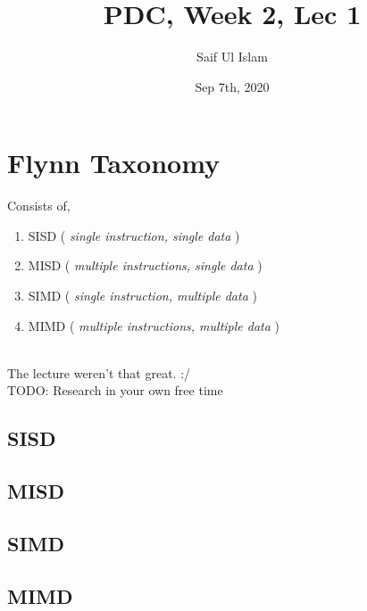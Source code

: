 \documentclass{article}
\author{Saif Ul Islam}
\date{Sep 7th, 2020}
\title{PDC, Week 2, Lec 1}
\begin{document}
    
    \maketitle

    \tableofcontents

    \section{Flynn Taxonomy}

    Consists of,

    \begin{enumerate}
        \item SISD ( \textit{single instruction, single data} )
        \item MISD ( \textit{multiple instructions, single data} )
        \item SIMD ( \textit{single instruction, multiple data} )
        \item MIMD ( \textit{multiple instructions, multiple data} )
    \end{enumerate}

    \\ The lecture weren't that great. :/
    \\ TODO: Research in your own free time

    \subsection{SISD}

    \paragraph{}

    \subsection{MISD}

    \paragraph{}

    \subsection{SIMD}

    \paragraph{}

    \subsection{MIMD}

    \paragraph{}
\end{document}
